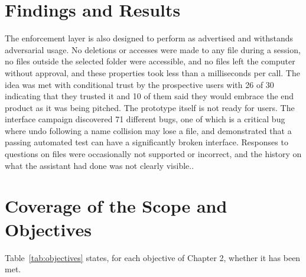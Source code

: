\documentclass{FastFyp}
\begin{document}
\section{Findings and Results}
The enforcement layer is also designed to perform as advertised and withstands adversarial usage. No deletions or accesses were made to any file during a session, no files outside the selected folder were accessible, and no files left the computer without approval, and these properties took less than a milliseconds per call. The idea was met with conditional trust by the prospective users with 26 of 30 indicating that they trusted it and 10 of them said they would embrace the end product as it was being pitched. The prototype itself is not ready for users. The interface campaign discovered 71 different bugs, one of which is a critical bug where undo following a name collision may lose a file, and demonstrated that a passing automated test can have a significantly broken interface. Responses to questions on files were occasionally not supported or incorrect, and the history on what the assistant had done was not clearly visible..

\section{Coverage of the Scope and Objectives}
Table~\ref{tab:objectives} states, for each objective of Chapter 2, whether it has been met.
\end{document}
